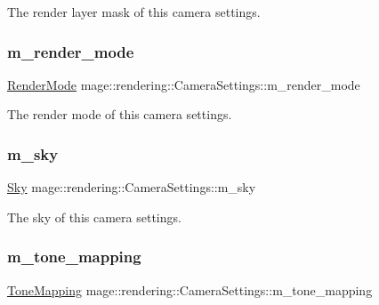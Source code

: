 The render layer mask of this camera settings. \hypertarget{classmage_1_1rendering_1_1_camera_settings_adf563f8bd1ee5cecd126c6b4731de6e5}{}\label{classmage_1_1rendering_1_1_camera_settings_adf563f8bd1ee5cecd126c6b4731de6e5} 
\subsubsection{\texorpdfstring{m\+\_\+render\+\_\+mode}{m\_render\_mode}}
{\footnotesize\ttfamily \hyperlink{namespacemage_1_1rendering_aeb14ce7610cc9391f4e01be027b91dcc}{Render\+Mode} mage\+::rendering\+::\+Camera\+Settings\+::m\+\_\+render\+\_\+mode\hspace{0.3cm}{\ttfamily [private]}}

The render mode of this camera settings. \hypertarget{classmage_1_1rendering_1_1_camera_settings_a62c726791db2c8ee20ef404e15c5f26c}{}\label{classmage_1_1rendering_1_1_camera_settings_a62c726791db2c8ee20ef404e15c5f26c} 
\subsubsection{\texorpdfstring{m\+\_\+sky}{m\_sky}}
{\footnotesize\ttfamily \hyperlink{classmage_1_1rendering_1_1_sky}{Sky} mage\+::rendering\+::\+Camera\+Settings\+::m\+\_\+sky\hspace{0.3cm}{\ttfamily [private]}}

The sky of this camera settings. \hypertarget{classmage_1_1rendering_1_1_camera_settings_a5a88df673aa475c5087bf74620048580}{}\label{classmage_1_1rendering_1_1_camera_settings_a5a88df673aa475c5087bf74620048580} 
\subsubsection{\texorpdfstring{m\+\_\+tone\+\_\+mapping}{m\_tone\_mapping}}
{\footnotesize\ttfamily \hyperlink{namespacemage_1_1rendering_a789e4b7d9a8cc831b065e9c6bb7430e9}{Tone\+Mapping} mage\+::rendering\+::\+Camera\+Settings\+::m\+\_\+tone\+\_\+mapping\hspace{0.3cm}{\ttfamily [private]}}

